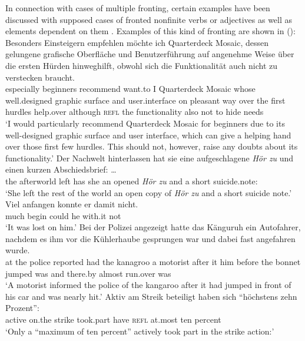 In connection with cases of multiple fronting, certain examples have been discussed with supposed
cases of fronted nonfinite verbs or adjectives as well as elements dependent on them
\citep{VogelgesangDoncer2004a}. Examples of this kind of fronting are shown in (): 
\eal
\label{bsp-pvp}
\ex 
\gll Besonders Einsteigern empfehlen möchte ich Quarterdeck Mosaic, dessen gelungene grafische Oberfläche und Benutzerführung auf angenehme Weise über die ersten Hürden hinweghilft, obwohl sich die Funktionalität auch nicht zu verstecken braucht.\footnotemark\\
     especially beginners recommend want.to I Quarterdeck Mosaic whose well.designed graphic surface and user.interface on pleasant way over the first hurdles help.over although \textsc{refl} the functionality also not to hide needs\\
\label{bsp-besonders-einsteigern}
\glt `I would particularly recommend Quarterdeck Mosaic for beginners due to its well-designed graphic surface and user interface, which can give a helping hand over those first few hurdles. This should not, however, raise any doubts about its functionality.'
\ex 
\gll Der Nachwelt hinterlassen hat sie eine aufgeschlagene \emph{Hör zu} und einen kurzen Abschiedsbrief: \ldots\footnotemark\\
     the afterworld left has she an opened \emph{Hör zu} and a short suicide.note:\\
\label{bsp-der-nachwelt-hinterlassen}
\glt `She left the rest of the world an open copy of \emph{Hör zu} and a short suicide note.'
\ex 
\gll Viel anfangen konnte er damit nicht.\footnotemark\\
	 much begin could he with.it not\\
\glt `It was lost on him.'
\ex 
\gll Bei der Polizei angezeigt hatte das Känguruh ein Autofahrer, nachdem es ihm vor die Kühlerhaube gesprungen war und dabei fast angefahren wurde.\footnotemark\\
	 at the police reported had the kanagroo a motorist after it him before the bonnet jumped was and there.by almost run.over was\\
\glt `A motorist informed the police of the kangaroo after it had jumped in front of his car and was nearly hit.'
\ex 
\gll Aktiv am Streik beteiligt haben sich "`höchstens zehn Prozent"':\footnotemark\\
     active on.the strike took.part have \textsc{refl} at.most ten percent\\%
\label{bsp-aktiv-am-streik}%
\glt `Only a ``maximum of ten percent'' actively took part in the strike action:'
\zl



